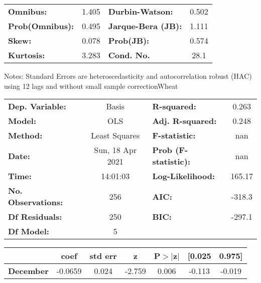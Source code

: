\begin{center}
\begin{tabular}{lcccccc}
\bottomrule
\end{tabular}
\begin{tabular}{lclc}
\textbf{Omnibus:}       &  1.405 & \textbf{  Durbin-Watson:     } &    0.502  \\
\textbf{Prob(Omnibus):} &  0.495 & \textbf{  Jarque-Bera (JB):  } &    1.111  \\
\textbf{Skew:}          &  0.078 & \textbf{  Prob(JB):          } &    0.574  \\
\textbf{Kurtosis:}      &  3.283 & \textbf{  Cond. No.          } &     28.1  \\
\bottomrule
\end{tabular}
\end{center}

Notes: \newline
 [1] Standard Errors are heteroscedasticity and autocorrelation robust (HAC) using 12 lags and without small sample correctionWheat\begin{center}
\begin{tabular}{lclc}
\toprule
\textbf{Dep. Variable:}    &      Basis       & \textbf{  R-squared:         } &     0.263   \\
\textbf{Model:}            &       OLS        & \textbf{  Adj. R-squared:    } &     0.248   \\
\textbf{Method:}           &  Least Squares   & \textbf{  F-statistic:       } &       nan   \\
\textbf{Date:}             & Sun, 18 Apr 2021 & \textbf{  Prob (F-statistic):} &      nan    \\
\textbf{Time:}             &     14:01:03     & \textbf{  Log-Likelihood:    } &    165.17   \\
\textbf{No. Observations:} &         256      & \textbf{  AIC:               } &    -318.3   \\
\textbf{Df Residuals:}     &         250      & \textbf{  BIC:               } &    -297.1   \\
\textbf{Df Model:}         &           5      & \textbf{                     } &             \\
\bottomrule
\end{tabular}
\begin{tabular}{lcccccc}
                   & \textbf{coef} & \textbf{std err} & \textbf{z} & \textbf{P$> |$z$|$} & \textbf{[0.025} & \textbf{0.975]}  \\
\midrule
\textbf{December}  &      -0.0659  &        0.024     &    -2.759  &         0.006        &       -0.113    &       -0.019     \\

\end{tabular}
\end{center}
